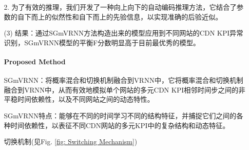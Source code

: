 \documentclass[letterpaper,12pt]{article}
\begin{document}
		2. 为了有效的推理，我们开发了一种向上向下的自动编码推理方法，它结合了参数的自下而上的似然性和自下而上的先验信息，以实现准确的后验近似。
	
	(3) 结果：通过SGmVRNN方法构造出来的模型应用到不同网站的CDN KPI异常识别，SGmVRNN模型的平衡F分数明显高于目前最优秀的模型。
	
	\paragraph{Proposed Method}
	
	SGmVRNN：将概率混合和切换机制融合到VRNN中，它将概率混合和切换机制融合到VRNN中，从而有效地模拟单个网站的多元CDN KPI相邻时间步之间的非平稳时间依赖性，以及不同网站之间的动态特性。
		
		SGmVRNN特点：能够在不同的时间学习不同的结构特征，并捕捉它们之间的各种时间依赖性，以表征不同CDN网站的多元KPI中的复杂结构和动态特征。
	
		切换机制(见Fig. \ref{fig: Switching Mechanism})
		
\end{document}
